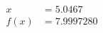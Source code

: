 \documentclass[preview]{standalone}
\begin{document}
\begin{align*}
x &= 5.0467\\f(x) &= 7.9997280
\end{align*}
\end{document}

